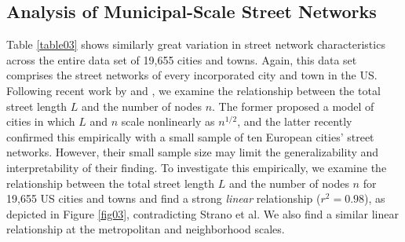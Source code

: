 \documentclass{article}
\begin{document}
\subsection{Analysis of Municipal-Scale Street Networks}

Table \ref{table03} shows similarly great variation in street network characteristics across the entire data set of 19,655 cities and towns. Again, this data set comprises the street networks of every incorporated city and town in the US. Following recent work by \citet{barthelemy_modeling_2008} and \citet{strano_urban_2013}, we examine the relationship between the total street length $L$ and the number of nodes $n$. The former proposed a model of cities in which $L$ and $n$ scale nonlinearly as $n^{1/2}$, and the latter recently confirmed this empirically with a small sample of ten European cities' street networks. However, their small sample size may limit the generalizability and interpretability of their finding. To investigate this empirically, we examine the relationship between the total street length $L$ and the number of nodes $n$ for 19,655 US cities and towns and find a strong \emph{linear} relationship ($r^{2}=0.98$), as depicted in Figure \ref{fig03}, contradicting Strano et al. We also find a similar linear relationship at the metropolitan and neighborhood scales.
\end{document}
